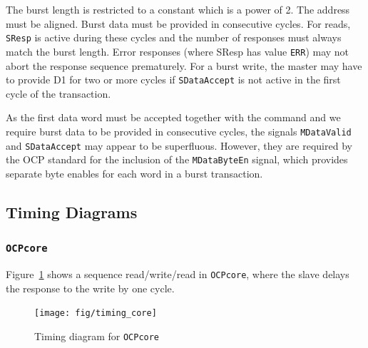 \documentclass[a4paper,fontsize=10pt,twoside,DIV15,BCOR12mm,headinclude=true,footinclude=false,pagesize,bibtotoc]{scrbook}
\newcommand{\code}[1]{{\texttt{#1}}}
\newcommand{\comment}[3]{

\textsf{\textbf{#1}} {\color{#3}#2}}
\newcommand{\wolf}[1]{\comment{Wolfgang}{#1}{OliveGreen}}
\newcommand{\martin}[1]{\comment{Martin}{#1}{Blue}}
\renewcommand{\wolf}[1]{}
\renewcommand{\martin}[1]{}
\begin{document}
\wolf{\code{OCPburst} currently allows neither pipelining nor
  same-cycle responses. If we want to, we can make it more like
  \code{OCPcore} or \code{OCPio}.}

The burst length is restricted to a constant which is a power of 2.
The address must be aligned. Burst data must be provided in
consecutive cycles. For reads, \code{SResp} is active during these
cycles and the number of responses must always match the burst length.
Error responses (where SResp has value \code{ERR}) may not abort the
response sequence prematurely. For a burst write, the master may have
to provide D1 for two or more cycles if \code{SDataAccept} is not
active in the first cycle of the transaction.

As the first data word must be accepted together with the command and
we require burst data to be provided in consecutive cycles, the
signals \code{MDataValid} and \code{SDataAccept} may appear to be
superfluous. However, they are required by the OCP standard for the
inclusion of the \code{MDataByteEn} signal, which provides separate
byte enables for each word in a burst transaction.

\martin{Burst: Is it legal (in our OCP subset) that SCmdAccept comes earlier than SDataAccept?} \wolf{No. Masters can assume that both signals are asserted in the same cycle.}

\martin{Burst: we said that we do not support pipelined requests in burst mode.
So when the slave sets SResp we are not allowing the master to initiate the next
request in the same cycle. Right?} \wolf{Right.}

\clearpage
\subsection{Timing Diagrams}

\subsubsection{\code{OCPcore}}

Figure~\ref{fig:timing_core} shows a sequence read/write/read in
\code{OCPcore}, where the slave delays the response to the write by
one cycle.

\begin{figure}
\centering
\texttt{[image: fig/timing\_core]}
\caption{Timing diagram for \code{OCPcore}}
\label{fig:timing_core}
\end{figure}
\end{document}
